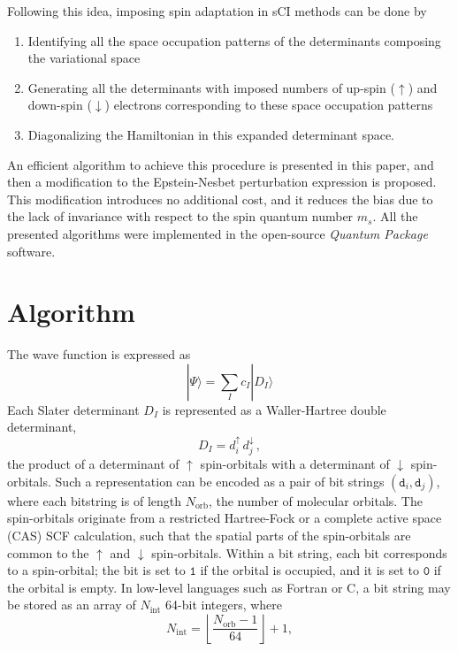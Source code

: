 \documentclass[aip,jcp,reprint,showkeys]{revtex4-1}
\newcommand{\ket}[1]{|#1\rangle}
\newcommand{\md}{\mathtt{d}}
\newcommand{\up}{\uparrow}
\newcommand{\dn}{\downarrow}
\newcommand{\Nint}{{N_\text{int}}}
\newcommand{\Norb}{{N_\text{orb}}}
\newcommand{\one}{{\texttt{1}}}
\newcommand{\zero}{{\texttt{0}}}
\newcommand{\sci}{sCI}
\begin{document}
Following this idea, imposing spin adaptation in {\sci} methods can be done by 
\begin{enumerate}
\item Identifying all the space occupation patterns of the determinants composing
      the variational space
\item Generating all the determinants with imposed numbers of up-spin ($\up$) and
      down-spin ($\dn$) electrons corresponding to these space occupation patterns
\item Diagonalizing the Hamiltonian in this expanded determinant space.
\end{enumerate}
An efficient algorithm to achieve this procedure is presented in this paper,
and then a modification to the Epstein-Nesbet perturbation expression is
proposed. This modification introduces no additional cost, and it reduces the
bias due to the lack of invariance with respect to the spin quantum number $m_s$.
All the presented algorithms were implemented in the open-source
\emph{Quantum Package} software.\cite{qp}



\section{Algorithm}

The wave function is expressed as
\begin{equation}
\ket{\Psi} = \sum_I c_I \ket{D_I}
\end{equation}
Each Slater determinant $D_I$ is represented as a Waller-Hartree double
determinant,\cite{Pauncz_1989}
\begin{equation}
 \label{eq:di}
 D_I = d_i^\up \, d_j^\dn\, ,
\end{equation}
the product of a determinant of $\up$ spin-orbitals with a determinant of $\dn$
spin-orbitals.
Such a representation can be encoded as a pair of bit strings $(\md_i,\md_j)$,
where each bitstring is of length $\Norb$, the number of molecular orbitals.
The spin-orbitals originate from a restricted Hartree-Fock or a complete
active space (CAS) SCF calculation, such that the spatial parts of the
spin-orbitals are common to the $\up$ and $\dn$ spin-orbitals.
Within a bit string, each bit corresponds to a spin-orbital; the bit is set
to $\one$ if the orbital is occupied, and it is set to $\zero$ if the orbital is empty.
In low-level languages such as Fortran or C, a bit
string may be stored as an array of $\Nint$ 64-bit integers, where 
\begin{equation}
  \Nint = \left \lfloor \frac{\Norb-1}{64} \right \rfloor + 1,
\end{equation}
\end{document}
